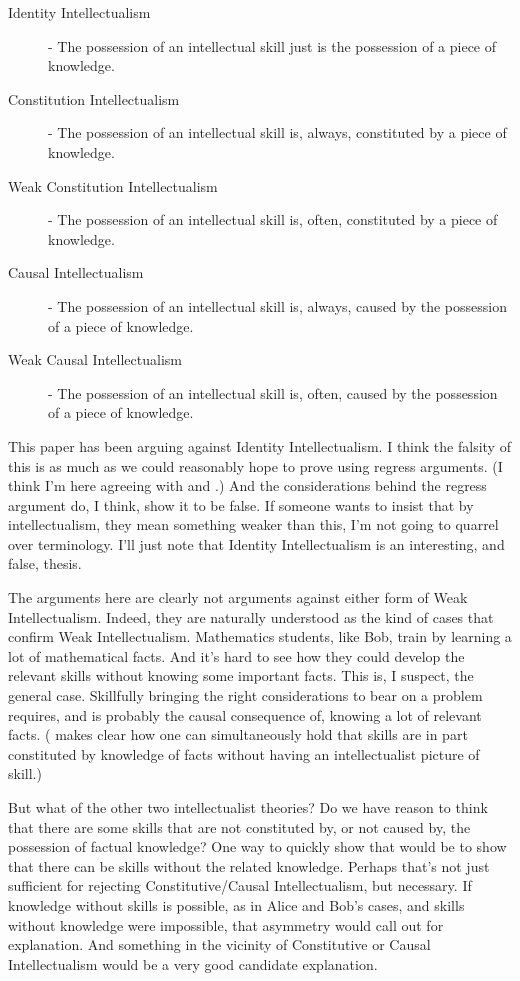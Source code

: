 \begin{description}
\item [Identity Intellectualism] - The possession of an intellectual skill just is the possession of a piece of knowledge.

\item [Constitution Intellectualism] - The possession of an intellectual skill is, always, constituted by a piece of knowledge.

\item [Weak Constitution Intellectualism] - The possession of an intellectual skill is, often, constituted by a piece of knowledge.

\item [Causal Intellectualism] - The possession of an intellectual skill is, always, caused by the possession of a piece of knowledge.

\item [Weak Causal Intellectualism] - The possession of an intellectual skill is, often, caus\-ed by the possession of a piece of knowledge.
\end{description}
This paper has been arguing against Identity Intellectualism. I think the falsity of this is as much as we could reasonably hope to prove using regress arguments. (I think I'm here agreeing with \citet{Wiggins2009} and \citet{Hornsby2011}.) And the considerations behind the regress argument do, I think, show it to be false. If someone wants to insist that by intellectualism, they mean something weaker than this, I'm not going to quarrel over terminology. I'll just note that Identity Intellectualism is an interesting, and false, thesis.

The arguments here are clearly not arguments against either form of Weak Intellectualism. Indeed, they are naturally understood as the kind of cases that confirm Weak Intellectualism. Mathematics students, like Bob, train by learning a lot of mathematical facts. And it's hard to see how they could develop the relevant skills without knowing some important facts. This is, I suspect, the general case. Skillfully bringing the right considerations to bear on a problem requires, and is probably the causal consequence of, knowing a lot of relevant facts. (\citet{Tsai2014} makes clear how one can simultaneously hold that skills are in part constituted by knowledge of facts without having an intellectualist picture of skill.)

But what of the other two intellectualist theories? Do we have reason to think that there are some skills that are not constituted by, or not caused by, the possession of factual knowledge? One way to quickly show that would be to show that there can be skills without the related knowledge. Perhaps that's not just sufficient for rejecting Constitutive\slash Causal Intellectualism, but necessary. If knowledge without skills is possible, as in Alice and Bob's cases, and skills without knowledge were impossible, that asymmetry would call out for explanation. And something in the vicinity of Constitutive or Causal Intellectualism would be a very good candidate explanation.

